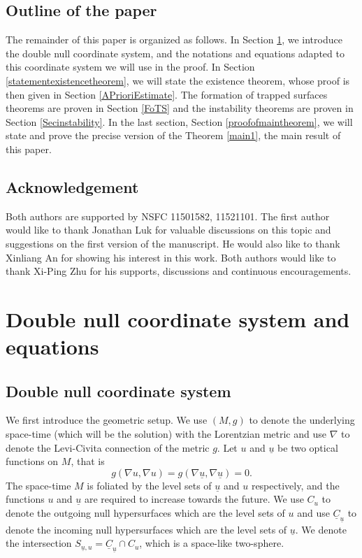 \documentclass[11pt,reqno]{amsart}
\theoremstyle{definition}
\numberwithin{equation}{section}
\def\ub{\underline{u}}
\def\Cb{\underline{C}}
\begin{document}
\subsection{Outline of the paper} The remainder of this paper is organized as follows. In Section \ref{preliminary}, we introduce the double null coordinate system, and the notations and equations adapted to this coordinate system we will use in the proof. In Section \ref{statementexistencetheorem}, we will state the existence theorem, whose proof is then given in Section \ref{APrioriEstimate}. The formation of trapped surfaces theorems are proven in Section \ref{FoTS} and the instability theorems are proven in Section \ref{Secinstability}. In the last section, Section \ref{proofofmaintheorem}, we will state and prove the precise version of the Theorem \ref{main1}, the main result of this paper.

\subsection{Acknowledgement} Both authors are supported by NSFC 11501582, 11521101. The first author would like to thank Jonathan Luk for valuable discussions on this topic and suggestions on the first version of the manuscript. He would also like to thank Xinliang An for showing his interest in this work. Both authors would like to thank Xi-Ping Zhu for his supports, discussions and continuous encouragements.

\section{Double null coordinate system and equations}\label{preliminary}


\subsection{Double null coordinate system}\label{doublenull}


We first introduce the geometric setup. We use $(M,g)$ to denote the underlying space-time (which will be the solution) with the Lorentzian metric and use $\nabla$ to denote the Levi-Civita connection of the metric $g$. Let $u$ and $\ub$ be two optical functions on $M$, that is $$g(\nabla u,\nabla u)=g(\nabla\ub,\nabla\ub)=0.$$
 The space-time $M$ is foliated by the level sets of $\ub$ and $u$ respectively, and the functions $u$ and $\ub$ are required to increase towards the future. We use $C_u$ to denote the outgoing null hypersurfaces which are the level sets of $u$ and use ${\Cb}_{\ub}$ to denote the incoming null hypersurfaces which are the level sets of $\ub$. We denote the intersection $S_{\ub,u}=\Cb_{\ub} \cap C_u$, which is a  space-like two-sphere.
\end{document}
